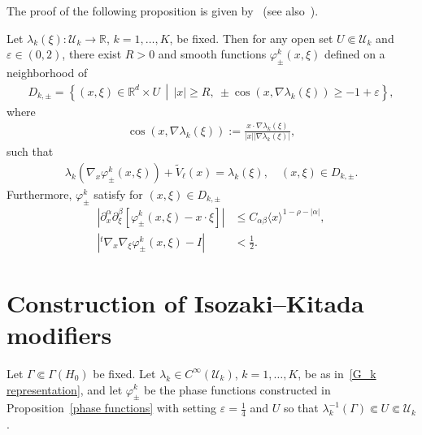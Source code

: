 \documentclass[10pt,a4paper]{amsart}
\newcommand{\e}{\varepsilon}
\newcommand{\f}{\varphi}
\renewcommand{\l}{\lambda}
\newcommand{\x}{\xi}
\newcommand{\R}{\mathbb{R}}
\newcommand{\US}{\mathcal{U}}
\begin{document}
The proof of the following proposition is given by~\cite[Section~2]{N3} (see also~\cite{IsoKita,T1}).

\begin{prop}\label{phase functions}
Let $\l_k(\x):\US_k\to\R$, $k=1,\dots,K$, be fixed. Then for any open set $U \Subset \US_k$ and $\e\in(0,2)$, there exist $R>0$ and smooth functions $\f_\pm^k(x,\x)$ defined on a neighborhood of
\begin{align*}
D_{k,\pm} = \left\{(x,\x)\in \R^d \times U \,\middle|\, |x| \geq R, \ \pm \cos(x,\nabla\lambda_k(\x)) \geq-1+\e \right\},
\end{align*}
where
\begin{align*}
\cos(x,\nabla\l_k(\x)) := \frac{x\cdot\nabla\l_k(\x)}{|x| |\nabla\l_k(\x)|},
\end{align*}
such that
\begin{align}\label{eikonal}
\l_k\left(\nabla_x\f_\pm^k(x,\x)\right) + \tilde V_\ell(x) = \l_k(\x), \quad (x,\x) \in D_{k,\pm}.
\end{align}
Furthermore, $\f_\pm^k$ satisfy for $(x,\xi)\in D_{k,\pm}$
\begin{align}
\left|\partial_x^\alpha\partial_\xi^\beta\left[\varphi_\pm^k(x,\xi)-x\cdot\xi\right]\right| &\leq C_{\alpha\beta} \langle x\rangle^{1-\rho-|\alpha|}, \label{phase estimate}
\\
\left|{}^t\nabla_x\nabla_\xi\varphi_\pm^k(x,\xi)-I \right|&<\frac{1}{2}. \label{phase estimate2}
\end{align}
\end{prop}


\section{Construction of Isozaki--Kitada modifiers}\label{IK section}

Let $\Gamma\Subset\Gamma(H_0)$ be fixed. Let $\l_k \in C^\infty(\US_k)$, $k=1,\dots,K$, be as in~\eqref{G_k representation}, and let $\f_{\pm}^{k}$ be the phase functions constructed in Proposition~\ref{phase functions} with setting $\e=\frac14$ and $U$ so that $\l_k^{-1}(\Gamma)\Subset U \Subset \US_k$.
\end{document}
